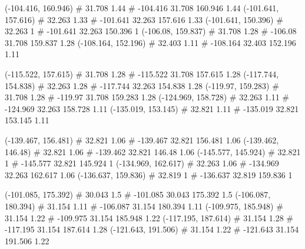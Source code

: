 \documentclass[a4paper,openbib,10pt]{article}
\newenvironment{treegraph}{\begin{graph}}{\end{graph}}
\begin{document}
\begin{treegraph}
  (-104.416, 160.946) #     31.708    1.44
   #    -104.416    31.708    160.946    1.44
  (-101.641, 157.616) #     32.263    1.33
   #    -101.641    32.263    157.616    1.33
  (-101.641, 150.396) #     32.263    1
   #    -101.641    32.263    150.396    1
  (-106.08, 159.837) #     31.708    1.28
   #    -106.08    31.708    159.837    1.28
  (-108.164, 152.196) #     32.403    1.11
   #    -108.164    32.403    152.196    1.11

  (-115.522, 157.615) #     31.708    1.28
   #    -115.522    31.708    157.615    1.28
  (-117.744, 154.838) #     32.263    1.28
   #    -117.744    32.263    154.838    1.28
  (-119.97, 159.283) #     31.708    1.28
   #    -119.97    31.708    159.283    1.28
  (-124.969, 158.728) #     32.263    1.11
   #    -124.969    32.263    158.728    1.11
  (-135.019, 153.145) #     32.821    1.11
   #    -135.019    32.821    153.145    1.11

  (-139.467, 156.481) #     32.821    1.06
   #    -139.467    32.821    156.481    1.06
  (-139.462, 146.48) #     32.821    1.06
   #    -139.462    32.821    146.48    1.06
  (-145.577, 145.924) #     32.821    1
   #    -145.577    32.821    145.924    1
  (-134.969, 162.617) #     32.263    1.06
   #    -134.969    32.263    162.617    1.06
  (-136.637, 159.836) #     32.819    1
   #    -136.637    32.819    159.836    1

  (-101.085, 175.392) #     30.043    1.5
   #    -101.085    30.043    175.392    1.5
  (-106.087, 180.394) #     31.154    1.11
   #    -106.087    31.154    180.394    1.11
  (-109.975, 185.948) #     31.154    1.22
   #    -109.975    31.154    185.948    1.22
  (-117.195, 187.614) #     31.154    1.28
   #    -117.195    31.154    187.614    1.28
  (-121.643, 191.506) #     31.154    1.22
   #    -121.643    31.154    191.506    1.22


\end{treegraph}
\end{document}

